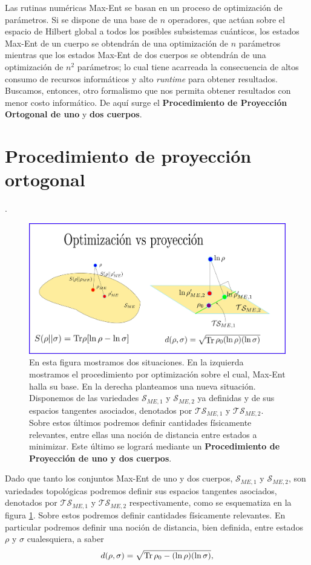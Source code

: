\documentclass{report} %
\numberwithin{equation}{section}
\begin{document}
Las rutinas numéricas Max-Ent se basan en un proceso de optimización de parámetros. Si se dispone de una base de $n$ operadores, que actúan sobre el espacio de Hilbert global a todos los posibles subsistemas cuánticos, los estados Max-Ent de un cuerpo se obtendrán de una optimización de $n$ parámetros mientras que los estados Max-Ent de dos cuerpos se obtendrán de una optimización de $n^2$ parámetros; lo cual tiene acarreada la consecuencia de altos consumo de recursos informáticos y alto \textit{runtime} para obtener resultados. Buscamos, entonces, otro formalismo que nos permita obtener resultados con menor costo informático. De aquí surge el \textbf{Procedimiento de Proyección Ortogonal de uno} y \textbf{dos cuerpos}. 

\section{Procedimiento de proyecci\'on ortogonal}. 
\label{ch_Max-Ent2}

\begin{figure}
    \centering
    \includegraphics[scale=0.41]{figs/aprox-ME3 (1)_page-0001.jpg}
    \caption{En esta figura mostramos dos situaciones. En la izquierda mostramos el procedimiento por optimización sobre el cual, Max-Ent halla su base. En la derecha planteamos una nueva situación. Disponemos de las variedades $\mathcal{S}_{ME,1}$ y $\mathcal{S}_{ME,2}$ ya definidas y de sus espacios tangentes asociados, denotados por $\mathcal{TS}_{ME,1}$ y $\mathcal{TS}_{ME,2}$. Sobre estos últimos podremos definir cantidades físicamente relevantes, entre ellas una noción de distancia entre estados a minimizar. Este último se logrará mediante un \textbf{Procedimiento de Proyección de uno y dos cuerpos}. }
    \label{aprox-ME3_page-0001}
\end{figure}

Dado que tanto los conjuntos Max-Ent de uno y dos cuerpos, $\mathcal{S}_{ME,1}$ y $\mathcal{S}_{ME,2}$, son variedades topológicas  podremos definir sus espacios tangentes asociados, denotados por $\mathcal{TS}_{ME,1}$ y $\mathcal{TS}_{ME,2}$ respectivamente, como se esquematiza en la figura \ref{aprox-ME3_page-0001}. Sobre estos podremos definir cantidades físicamente relevantes. En particular podremos definir \cite{NakaharaM} una noción de distancia, bien definida, entre estados $\rho$ y $\sigma$ cualesquiera, a saber 
\begin{equation}
    d(\rho,\sigma) = \sqrt{\Tr \rho_0 - (\ln \rho)(\ln \sigma)}, \label{state_distance}
\end{equation}
\end{document}
